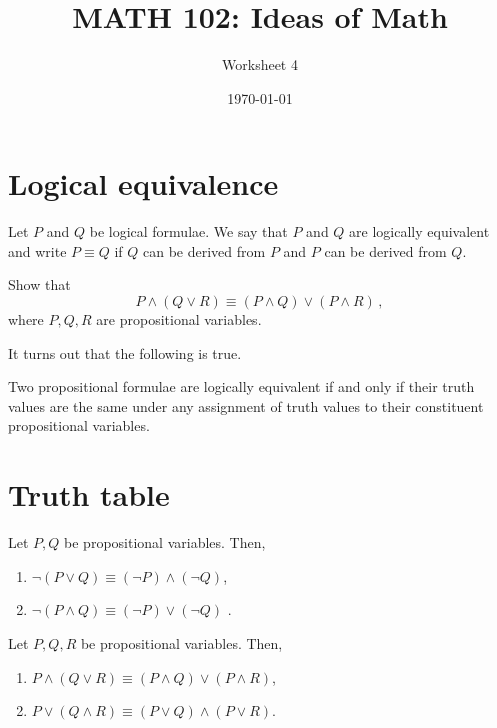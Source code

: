 \documentclass[12pt]{amsart}
\title{ MATH 102: Ideas  of Math }
\author{ Worksheet 4 }
\date{\today}
\begin{document}
\maketitle


\section{Logical equivalence}

\begin{definition}
    Let $P$ and $Q$ be logical formulae.
    We say that $P$ and $Q$ are logically equivalent and write $P\equiv Q$
    if $Q$ can be derived from $P$ and $P$ can be derived from $Q$.
\end{definition}

\begin{problem}
    Show that
        $$ P \wedge (Q \vee R) \equiv (P \wedge Q)\vee (P \wedge R) \,,$$
        where $P, Q, R$ are propositional variables.
\end{problem}

It turns out that the following is true.
\begin{theorem}
    Two propositional formulae are logically equivalent if and only if their truth values
are the same under any assignment of truth values to their constituent propositional
variables.
\end{theorem}

\section{Truth table}


\begin{theorem}
   Let $P, Q$ be propositional variables. Then,
   \begin{enumerate}
       \item $\neg (P \vee Q) \equiv (\neg P) \wedge (\neg Q) $,
       \item $\neg (P \wedge Q) \equiv (\neg P) \vee (\neg Q) $ .
   \end{enumerate}
\end{theorem}

\begin{theorem}
    Let $P, Q, R$ be propositional variables. Then,
    \begin{enumerate}
        \item $P\wedge (Q\vee R) \equiv (P \wedge Q) \vee (P \wedge R)$,
        \item $P \vee (Q\wedge R) \equiv (P \vee Q) \wedge (P \vee R)$.
    \end{enumerate}
\end{theorem}
\end{document}
